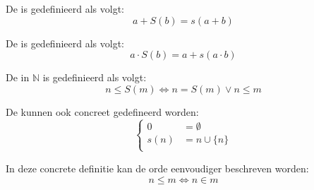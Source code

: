\documentclass[main.tex]{subfiles}
\begin{document}
\begin{de}
  De  is gedefinieerd als volgt:
  \[ a + S(b) = s(a+b) \]
\end{de}

\begin{de}
  De  is gedefinieerd als volgt:
  \[ a \cdot S(b) = a+ s(a\cdot b) \]
\end{de}

\begin{de}
  De  in $\mathbb{N}$ is gedefinieerd als volgt:
  \[ n \le S(m) \Leftrightarrow n = S(m) \vee n \le m \]
\end{de}

\begin{de}
  De  kunnen ook concreet gedefineerd worden:
  \[
  \left\{
  \begin{array}{rl}
    0 &= \emptyset\\
    s(n) &= n \cup \{ n \}\\
  \end{array}
  \right.
  \]
\end{de}

\begin{st}
  In deze concrete definitie kan de orde eenvoudiger beschreven worden:
  \[ n \le m  \Leftrightarrow n \in m \]
\end{st}
\end{document}
